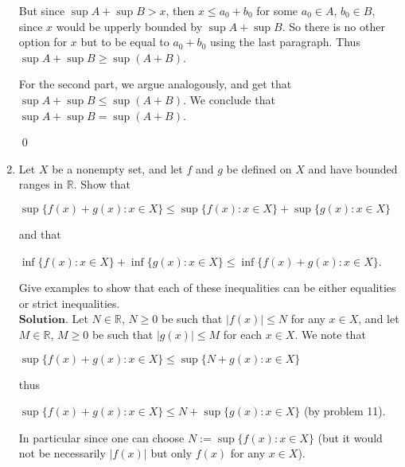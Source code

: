 \documentclass{article}
\theoremstyle{remark}
\begin{document}
\begin{enumerate}
            But since $\sup A + \sup B > x$, then $x \leq a_0+b_0$ for some $a_0 \in A$, $b_0 \in B$, since $x$ would be upperly bounded 
            by $\sup A + \sup B$. So there is no other option for $x$ but to be equal to $a_0 + b_0$ using the last paragraph.
            Thus $\sup A + \sup B \geq \sup(A+B)$.

            For the second part, we argue analogously, and get that $\sup A + \sup B \leq \sup(A+B)$. We conclude that $\sup A + \sup B = \sup (A+B)$.
            \begin{flushright}
                \qed
            \end{flushright}

            \item Let $X$ be a nonempty set, and let $f$ and $g$ be defined on $X$ and have bounded ranges in 
            $\mathbb{R}$. Show that 
            \begin{center}
                $\sup \{f(x) + g(x): x\in X\} \leq \sup \{f(x): x\in X\} + \sup \{g(x): x\in X\}$
            \end{center}
            and that 
            \begin{center}
                $\inf \{f(x): x\in X\} + \inf\{g(x): x \in X\} \leq \inf \{f(x) + g(x): x \in X\}$.
            \end{center}
            Give examples to show that each of these inequalities can be either equalities or strict inequalities.\\
            $\textbf{Solution.}$
            Let $N \in \mathbb{R}$, $N \geq 0$ be such that $\vert f(x)\vert \leq N$ for any $x \in X$, and let $M \in \mathbb{R}$, $M \geq 0$ be such that 
            $\vert g(x)\vert \leq M$ for each $x \in X$.
            We note that 
            \begin{center}
                $\sup\{f(x)+g(x): x \in X\} \leq \sup \{N + g(x): x \in X\}$
            \end{center}
            thus 
            \begin{center}
                $\sup\{f(x) + g(x): x \in X\} \leq  N + \sup \{g(x): x \in X\}$ (by problem 11).
            \end{center}
            In particular since one can choose $N := \sup \{f(x): x \in X\}$ (but it would not be necessarily $\vert f(x)\vert$ but only $f(x)$ for any $x \in X$). 
            

\end{enumerate}
\end{document}
